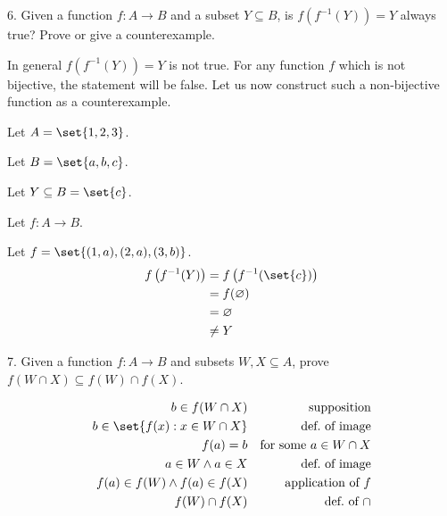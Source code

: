 \documentclass{hippoidC}
\begin{document}
\begin{prooflist}{6. Given a function $f: A \rightarrow B$ and a subset $Y
			\subseteq B$, is $f\left(f^{-1}(Y)\right)=Y$ always true? Prove or give a
		counterexample.}
	\item \imagedef{}
	\item In general $f\left(f^{-1}(Y)\right)=Y$ is not true. For any function $f$
	which is not bijective, the statement will be false. Let us now construct
	such a non-bijective function as a counterexample.
	\item Let $A=\set{1, 2, 3}$.
	\item Let $B=\set{a, b, c}$.
	\item Let $Y\subseteq B = \set{c}$.
	\item Let $f: A \rightarrow B$.
	\item Let $f = \set{(1, a), (2, a), (3, b)}$.
	\begin{align*}
		f\left(f^{-1}(Y)\right) & = f\left(f^{-1}(\set{c})\right) \\
		                        & = f(\varnothing)                \\
		                        & = \varnothing                   \\
		                        & \neq Y
	\end{align*}
\end{prooflist}

\begin{prooflist}{7. Given a function $f: A \rightarrow B$ and subsets $W, X \subseteq A$, prove $f(W \cap X) \subseteq f(W) \cap f(X)$.}
	\item \imagedef{}
	\begin{align*}
		b\in f(W\cap X)                   &  & \text{supposition}           \\
		b\in \set{f(x): x \in W\cap X}    &  & \text{def.\ of image}        \\
		f(a) = b                          &  & \text{for some }a\in W\cap X \\
		a \in W \land a \in X             &  & \text{def.\ of image}        \\
		f(a) \in f(W) \land f(a) \in f(X) &  & \text{application of }f      \\
		f(W) \cap f(X)                    &  & \text{def.\ of }\cap
	\end{align*}
\end{prooflist}
\end{document}
